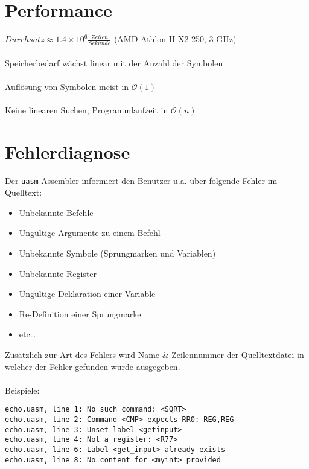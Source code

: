 \section{Performance}

\begin{frame}[fragile]{\insertsection}
    $Durchsatz \approx 1.4 \times 10^6 \frac{Zeilen}{Sekunde}$
    (AMD Athlon II X2 250, 3 GHz) \\~\\
    Speicherbedarf wächst linear mit der Anzahl der Symbolen \\~\\
    Auflösung von Symbolen meist in $\mathcal{O}(1)$ \\~\\
    Keine linearen Suchen; Programmlaufzeit in $\mathcal{O}(n)$
\end{frame}

\section{Fehlerdiagnose}

\begin{frame}{\insertsection}
    Der \texttt{uasm} Assembler informiert den Benutzer u.a. über folgende
    Fehler im Quelltext:
    \begin{itemize}
        \item Unbekannte Befehle
        \item Ungültige Argumente zu einem Befehl
        \item Unbekannte Symbole (Sprungmarken und Variablen)
        \item Unbekannte Register
        \item Ungültige Deklaration einer Variable
        \item Re-Definition einer Sprungmarke
        \item etc\ldots{}
    \end{itemize}
\end{frame}

\begin{frame}[fragile]{\insertsection}
    Zusätzlich zur Art des Fehlers wird Name \& Zeilennummer der Quelltextdatei
    in welcher der Fehler gefunden wurde ausgegeben.\\~\\
    Beispiele:
\begin{verbatim}
echo.uasm, line 1: No such command: <SQRT>
echo.uasm, line 2: Command <CMP> expects RR0: REG,REG
echo.uasm, line 3: Unset label <getinput>
echo.uasm, line 4: Not a register: <R77>
echo.uasm, line 6: Label <get_input> already exists
echo.uasm, line 8: No content for <myint> provided
\end{verbatim}
\end{frame}

